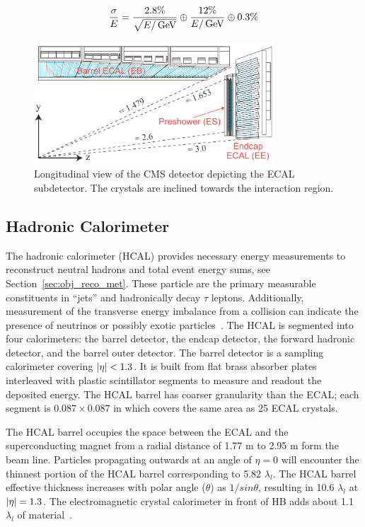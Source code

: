 \begin{equation}
\label{eqn:ecal_res}
\frac{\sigma}{E} = \frac{2.8\%}{\sqrt{E/\,\mathrm{GeV}}} \oplus \frac{12\%}{E/\,\mathrm{GeV}} \oplus 0.3\%
\end{equation}



\begin{figure}[htbp]
\centering
     \includegraphics[width=0.8\textwidth]{cms_and_lhc/plots/cms_ecal.png}
     \caption{
Longitudinal view of the CMS detector depicting the ECAL subdetector.
The crystals are inclined towards the interaction region.
     }
     \label{fig:cms_ecal}
\end{figure}



\subsection{Hadronic Calorimeter}
The hadronic calorimeter (HCAL) provides necessary energy measurements
to reconstruct neutral hadrons and total event energy sums, see Section~\ref{sec:obj_reco_met}. 
These particle are the primary measurable constituents in ``jets'' and hadronically decay $\tau$
leptons. Additionally, measurement of the transverse energy imbalance from a collision
can indicate the presence of neutrinos or possibly exotic particles~\cite{CMS-Proposal}.
The HCAL is segmented into four calorimeters: the barrel detector, the endcap detector,
the forward hadronic detector, and the barrel outer detector. 
The barrel detector is a sampling calorimeter covering $\lvert\eta\rvert < 1.3$. It is built
from flat brass absorber plates interleaved with plastic scintillator segments to
measure and readout the deposited energy. The HCAL barrel has coarser granularity
than the ECAL; each segment is $0.087 \times 0.087$ in \etaphi which covers the
same area as 25 ECAL crystals.

The HCAL barrel occupies the space between the ECAL and the superconducting magnet
from a radial distance of 1.77 m to 2.95 m form the beam line. Particles propagating
outwards at an angle of $\eta = 0$ will encounter the thinnest portion of the
HCAL barrel corresponding to 5.82 $\lambda_{l}$. 
The HCAL barrel effective thickness increases with polar angle ($\theta$) 
as $1/sin\theta$, resulting in 10.6 $\lambda_{l}$ at 
$\lvert\eta\rvert = 1.3$. The electromagnetic crystal calorimeter in front of HB adds about 
1.1 $\lambda_{l}$ of material~\cite{Chatrchyan:2008zzk}.

